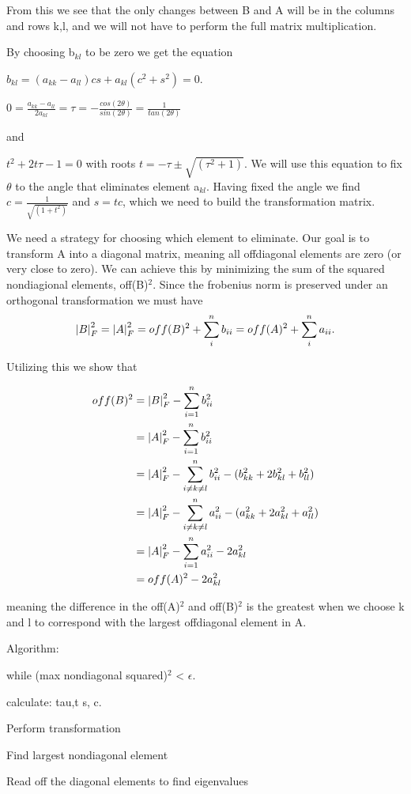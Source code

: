 From this we see that the only changes between B and A will be in the columns
and rows k,l, and we will not have to perform the full matrix multiplication.

By choosing b$_{kl}$ to be zero we get the equation

$b_{kl} = (a_{kk}-a_{ll})cs + a_{kl} (c^2 + s^2) = 0$.

$0 = \frac{a_{kk} - a_{ll}}{2a_{kl}} = \tau = -\frac{cos(2\theta)}{sin(2\theta)} = \frac{1}{tan(2\theta)}$

and

$t^2 + 2t\tau -1 = 0$ with roots $t = -\tau \pm \sqrt{(\tau^2 + 1)}$. We will
use this equation to fix $\theta$ to the angle that eliminates element a$_{kl}$.
Having fixed the angle we find $c = \frac{1}{\sqrt{(1+t^2)}}$ and $s = tc$, which
we need to build the transformation matrix.

We need a strategy for choosing which element to eliminate. Our goal is to
transform A into a diagonal matrix, meaning all offdiagonal elements are zero
(or very close to zero). We can achieve this by minimizing the sum of the
squared nondiagional elements, off(B)$^2$. Since the frobenius norm is
preserved under an orthogonal transformation we must have
$$ \abs{B}_F^2 = \abs{A}_F^2 =  off(B)^2 + \sum_{i}^{n} b_{ii} = off(A)^2 + \sum_{i}^{n} a_{ii}.$$

Utilizing this we show that

\begin{align*}
  off(B)^2 &= \abs{B}_F^2 - \sum_{i=1}^{n} b_{ii}^2 \\
  &= \abs{A}_F^2 - \sum_{i=1}^{n} b_{ii}^2 \\
  &= \abs{A}_F^2 - \sum_{i \neq k \neq l}^{n} b_{ii}^2 - (b_{kk}^2 + 2b_{kl}^2 + b_{ll}^2) \\
  &= \abs{A}_F^2 - \sum_{i\neq k \neq l}^{n} a_{ii}^2 - (a_{kk}^2 + 2a_{kl}^2 + a_{ll}^2) \\
  &= \abs{A}_F^2 - \sum_{i=1}^{n} a_{ii}^2 - 2a_{kl}^2 \\
  &= off(A)^2 - 2a_{kl}^2
\end{align*}

meaning the difference in the off(A)$^2$ and off(B)$^2$ is the greatest
when we choose k and l to correspond with the largest offdiagonal element in A.




Algorithm:

while (max nondiagonal squared)$^2$ < $\epsilon$.


  calculate: tau,t s, c.

  Perform transformation

  Find largest nondiagonal element

Read off the diagonal elements to find eigenvalues
